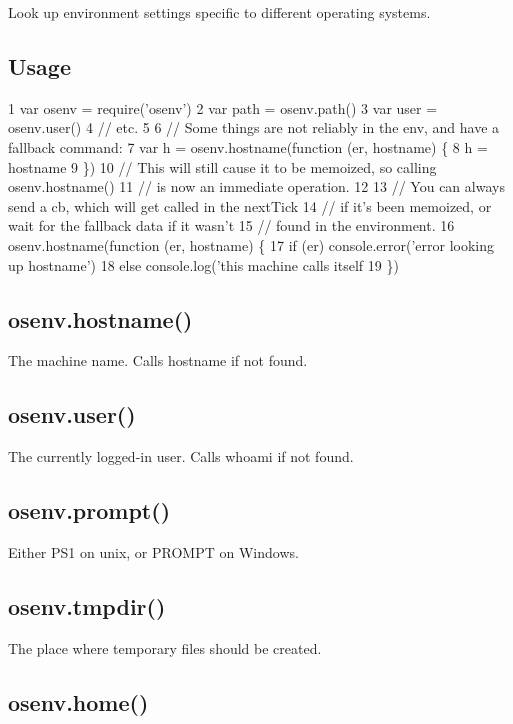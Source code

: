 Look up environment settings specific to different operating systems.

\subsection*{Usage}


\begin{DoxyCode}
1 var osenv = require('osenv')
2 var path = osenv.path()
3 var user = osenv.user()
4 // etc.
5 
6 // Some things are not reliably in the env, and have a fallback command:
7 var h = osenv.hostname(function (er, hostname) \{
8   h = hostname
9 \})
10 // This will still cause it to be memoized, so calling osenv.hostname()
11 // is now an immediate operation.
12 
13 // You can always send a cb, which will get called in the nextTick
14 // if it's been memoized, or wait for the fallback data if it wasn't
15 // found in the environment.
16 osenv.hostname(function (er, hostname) \{
17   if (er) console.error('error looking up hostname')
18   else console.log('this machine calls itself %
19 \})
\end{DoxyCode}


\subsection*{osenv.\+hostname()}

The machine name. Calls {\ttfamily hostname} if not found.

\subsection*{osenv.\+user()}

The currently logged-\/in user. Calls {\ttfamily whoami} if not found.

\subsection*{osenv.\+prompt()}

Either P\+S1 on unix, or P\+R\+O\+M\+P\+T on Windows.

\subsection*{osenv.\+tmpdir()}

The place where temporary files should be created.

\subsection*{osenv.\+home()}

